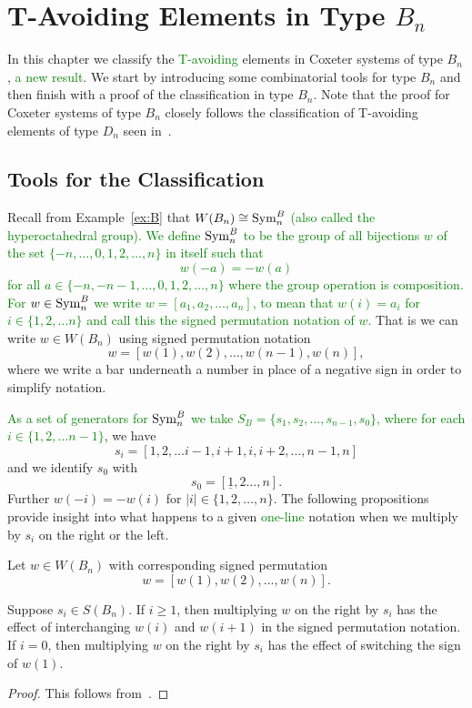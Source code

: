 \chapter{T-Avoiding Elements in Type $B_n$}\label{chap:BnandCn}

In this chapter we classify the \textcolor{green}{T-avoiding} elements in Coxeter systems of type $B_n$, \textcolor{green}{a new result}. We start by introducing some combinatorial tools for type $B_n$ and then finish with a proof of the classification in type $B_n$. Note that the proof for Coxeter systems of type $B_n$ closely follows the classification of T-avoiding elements of type $D_n$ seen in~\cite{Gern2013a}. 

\section{Tools for the Classification}\label{sec:Btools}

Recall from Example~\ref{ex:B} that $W(B_n) \cong \mathrm{Sym}_n^B$ \textcolor{green}{(also called the hyperoctahedral group). We define $\mathrm{Sym}_n^B$ to be the group of all bijections $w$ of the set $\{-n, \ldots, 0, 1, 2, \ldots, n\}$ in itself such that 
\[w(-a)=-w(a)\] for all $a \in \{-n, -n-1, \ldots, 0, 1, 2, \ldots, n\}$ where the group operation is composition. For $w \in \mathrm{Sym}_n^B$ we write $w=[a_1, a_2, \ldots, a_n]$, to mean that $w(i)=a_i$ for $i \in \{1,2, \ldots n\}$ and call this the signed permutation notation of $w$.} That is we can write $w \in W(B_n)$ using signed permutation notation 
\[ w=[w(1),w(2), \ldots, w(n-1), w(n)], \]
where we write a bar underneath a number in place of a negative sign in order to simplify notation. 

\textcolor{green}{As a set of generators for $\mathrm{Sym}_n^B$ we take $S_B=\{s_1,s_2, \ldots, s_{n-1},s_0\}$, where for each $i \in \{1,2,\ldots n-1\}$}, we have
\[s_i=[1,2, \ldots i-1, i+1,i,i+2, \ldots, n-1,n] \] and we identify $s_0$ with
\[s_0=[\underline{1}, 2 \ldots, n].\] Further $w(-i)=-w(i)$ for $|i| \in \{1,2, \ldots, n\}$. The following propositions provide insight into what happens to a given \textcolor{green}{one-line} notation when we multiply by $s_i$ on the right or the left.

\begin{proposition}
	Let $w \in W(B_n)$ with corresponding signed permutation 
	\[w=[w(1),w(2), \ldots ,w(n)].\]
	
	Suppose $s_i \in S(B_n)$. If $i \geq 1$, then multiplying $w$ on the right by $s_i$ has the effect of interchanging $w(i)$ and $w(i+1)$ in  the signed permutation notation. If $i=0$, then multiplying $w$ on the right by $s_i$ has the effect of switching the sign of $w(1)$. 	
	\begin{proof}
	This follows from~\cite[Section 8.1 and A3.1]{Bjorner2005}.	
	\end{proof}
\end{proposition}

